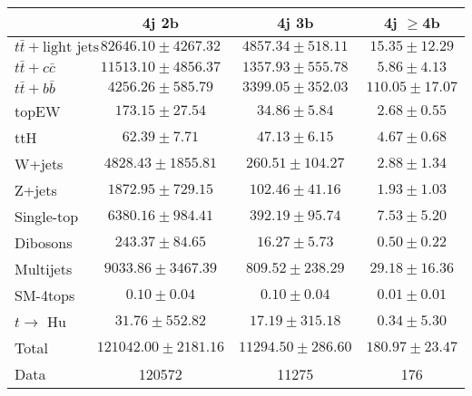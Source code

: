 \begin{table}
\begin{center}
  \begin{tabular}{ | l |  c |  c |  c | }
    \hline \hline 
     & 4j 2b  & 4j 3b  & 4j $\geq$4b  \\ 
    \hline 
     $t\bar{t}+\text{light jets}$  &   $ 82646.10 \pm 4267.32 $ &   $ 4857.34 \pm 518.11 $ &   $ 15.35 \pm 12.29 $ \\ 
     $t\bar{t}+c\bar{c}$  &   $ 11513.10 \pm 4856.37 $ &   $ 1357.93 \pm 555.78 $ &   $ 5.86 \pm 4.13 $ \\ 
     $t\bar{t}+b\bar{b}$  &   $ 4256.26 \pm 585.79 $ &   $ 3399.05 \pm 352.03 $ &   $ 110.05 \pm 17.07 $ \\ 
    topEW  &   $ 173.15 \pm 27.54 $ &   $ 34.86 \pm 5.84 $ &   $ 2.68 \pm 0.55 $ \\ 
    ttH  &   $ 62.39 \pm 7.71 $ &   $ 47.13 \pm 6.15 $ &   $ 4.67 \pm 0.68 $ \\ 
    W+jets  &   $ 4828.43 \pm 1855.81 $ &   $ 260.51 \pm 104.27 $ &   $ 2.88 \pm 1.34 $ \\ 
    Z+jets  &   $ 1872.95 \pm 729.15 $ &   $ 102.46 \pm 41.16 $ &   $ 1.93 \pm 1.03 $ \\ 
    Single-top  &   $ 6380.16 \pm 984.41 $ &   $ 392.19 \pm 95.74 $ &   $ 7.53 \pm 5.20 $ \\ 
    Dibosons  &   $ 243.37 \pm 84.65 $ &   $ 16.27 \pm 5.73 $ &   $ 0.50 \pm 0.22 $ \\ 
    Multijets  &   $ 9033.86 \pm 3467.39 $ &   $ 809.52 \pm 238.29 $ &   $ 29.18 \pm 16.36 $ \\ 
    SM-4tops  &   $ 0.10 \pm 0.04 $ &   $ 0.10 \pm 0.04 $ &   $ 0.01 \pm 0.01 $ \\ 
     $t\rightarrow$ Hu  &   $ 31.76 \pm 552.82 $ &   $ 17.19 \pm 315.18 $ &   $ 0.34 \pm 5.30 $ \\ 
    Total  &   $ 121042.00 \pm 2181.16 $ &   $ 11294.50 \pm 286.60 $ &   $ 180.97 \pm 23.47 $ \\ 
    \hline 
    Data  & 120572  & 11275  & 176  \\ 
    \hline \hline 
  \end{tabular} 



\end{center}
\end{table}
